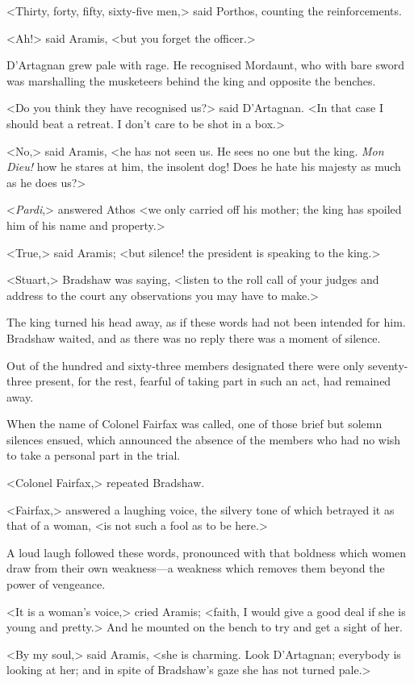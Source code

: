 <Thirty, forty, fifty, sixty-five men,> said Porthos, counting the reinforcements.

<Ah!> said Aramis, <but you forget the officer.>

D'Artagnan grew pale with rage. He recognised Mordaunt, who with bare sword was marshalling the musketeers behind the king and opposite the benches.

<Do you think they have recognised us?> said D'Artagnan. <In that case I should beat a retreat. I don't care to be shot in a box.>

<No,> said Aramis, <he has not seen us. He sees no one but the king. \textit{Mon Dieu!} how he stares at him, the insolent dog! Does he hate his majesty as much as he does us?>

<\textit{Pardi},> answered Athos <we only carried off his mother; the king has spoiled him of his name and property.>

<True,> said Aramis; <but silence! the president is speaking to the king.>

<Stuart,> Bradshaw was saying, <listen to the roll call of your judges and address to the court any observations you may have to make.>

The king turned his head away, as if these words had not been intended for him. Bradshaw waited, and as there was no reply there was a moment of silence.

Out of the hundred and sixty-three members designated there were only seventy-three present, for the rest, fearful of taking part in such an act, had remained away.

When the name of Colonel Fairfax was called, one of those brief but solemn silences ensued, which announced the absence of the members who had no wish to take a personal part in the trial.

<Colonel Fairfax,> repeated Bradshaw.

<Fairfax,> answered a laughing voice, the silvery tone of which betrayed it as that of a woman, <is not such a fool as to be here.>

A loud laugh followed these words, pronounced with that boldness which women draw from their own weakness—a weakness which removes them beyond the power of vengeance.

<It is a woman's voice,> cried Aramis; <faith, I would give a good deal if she is young and pretty.> And he mounted on the bench to try and get a sight of her.

<By my soul,> said Aramis, <she is charming. Look D'Artagnan; everybody is looking at her; and in spite of Bradshaw's gaze she has not turned pale.>

